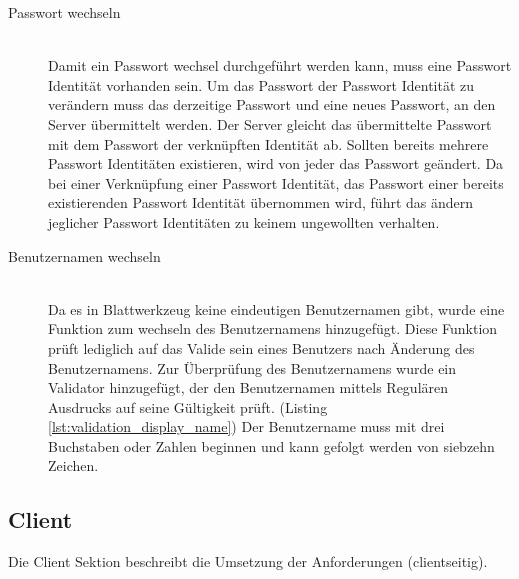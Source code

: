 \begin{description}
	\item[Passwort wechseln]\hfill\\
	Damit ein Passwort wechsel durchgeführt werden kann, muss eine Passwort Identität vorhanden sein. Um das Passwort der Passwort Identität zu verändern muss das derzeitige Passwort und eine neues Passwort, an den Server übermittelt werden. Der Server gleicht das übermittelte Passwort mit dem Passwort der verknüpften Identität ab. Sollten bereits mehrere Passwort Identitäten existieren, wird von jeder das Passwort geändert. Da bei einer Verknüpfung einer Passwort Identität, das Passwort einer bereits existierenden Passwort Identität übernommen wird, führt das ändern jeglicher Passwort Identitäten zu keinem ungewollten verhalten.
	\item[Benutzernamen wechseln]\hfill\\
	Da es in Blattwerkzeug keine eindeutigen Benutzernamen gibt, wurde eine Funktion zum wechseln des Benutzernamens hinzugefügt. Diese Funktion prüft lediglich auf das Valide sein eines Benutzers nach Änderung des Benutzernamens. Zur Überprüfung des Benutzernamens wurde ein Validator hinzugefügt, der den Benutzernamen mittels Regulären Ausdrucks auf seine Gültigkeit prüft. (Listing \ref{lst:validation_display_name}) Der Benutzername muss mit drei Buchstaben oder Zahlen beginnen und kann gefolgt werden von siebzehn Zeichen.

\end{description}




\subsection{Client}
\label{sec: client}
Die Client Sektion beschreibt die Umsetzung der Anforderungen (clientseitig). 

